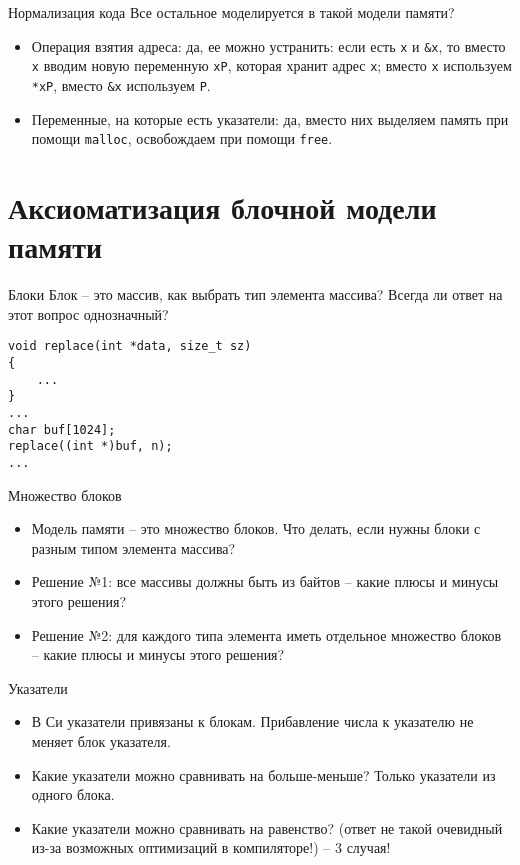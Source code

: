 \documentclass[hyperref={unicode=true}]{beamer}
\begin{document}
    \begin{frame}{Нормализация кода}
    Все остальное моделируется в такой модели памяти?
    \begin{itemize}
    \item Операция взятия адреса: да, ее можно устранить:
    если есть \texttt{x} и \texttt{\&x}, то вместо \texttt{x}
    вводим новую переменную \texttt{xP}, которая хранит адрес \texttt{x};
    вместо \texttt{x} используем \texttt{*xP}, вместо
    \texttt{\&x} используем \texttt{P}.
    \item Переменные, на которые есть указатели: да,
    вместо них выделяем память при помощи \texttt{malloc},
    освобождаем при помощи \texttt{free}.
    \end{itemize}
    \end{frame}

    \section{Аксиоматизация блочной модели памяти}
\fi

    \begin{frame}[fragile]{Блоки}
    Блок -- это массив, как выбрать тип элемента массива?
    Всегда ли ответ на этот вопрос однозначный?

    \begin{lstlisting}
void replace(int *data, size_t sz)
{
    ...
}
...
char buf[1024];
replace((int *)buf, n);
...
    \end{lstlisting}
    \end{frame}

    \begin{frame}{Множество блоков}
    \begin{itemize}
    \item
    Модель памяти -- это множество блоков. Что делать,
    если нужны блоки с разным типом элемента массива?
    \item
    Решение №1: все массивы должны быть из байтов
    -- какие плюсы и минусы этого решения?
    \item
    Решение №2: для каждого типа элемента
    иметь отдельное множество блоков
    -- какие плюсы и минусы этого решения?
    \end{itemize}
    \end{frame}

    \begin{frame}{Указатели}
    \begin{itemize}
    \item
    В Си указатели привязаны к блокам. Прибавление
    числа к указателю не меняет блок указателя.
    \item
    Какие указатели можно сравнивать на больше-меньше?
    Только указатели из одного блока.
    \item
    Какие указатели можно сравнивать на равенство?
    (ответ не такой очевидный из-за возможных
    оптимизаций в компиляторе!) -- 3 случая!
    \end{itemize}
    \end{frame}
\end{document}
